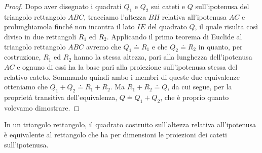 \noindent\begin{minipage}{0.55\textwidth}\parindent15pt
\begin{proof}
Dopo aver disegnato i quadrati $Q_1$ e $Q_2$ sui cateti e $Q$ 
sull'ipotenusa del triangolo rettangolo $ABC$, tracciamo l'altezza 
$BH$ relativa all'ipotenusa $AC$ e prolunghiamola finché non incontra 
il lato $IE$ del quadrato $Q$, il quale risulta così diviso in due 
rettangoli $R_1$ ed $R_2$.
Applicando il primo teorema di Euclide al triangolo rettangolo $ABC$ 
avremo che $Q_1\doteq R_1$ e che $Q_2\doteq R_2$ in quanto, per 
costruzione, $R_1$ ed $R_2$ hanno la stessa altezza, pari alla 
lunghezza dell'ipotenusa $AC$ e ognuno di essi ha la base pari alla 
proiezione sull'ipotenusa stessa del relativo cateto. Sommando quindi 
ambo i membri di queste due equivalenze otteniamo che $Q_1+Q_2\doteq 
R_1+R_2$. Ma $R_1+R_2\doteq Q$, da cui segue, per la proprietà 
transitiva dell'equivalenza, $Q\doteq Q_1+Q_2$, che è proprio quanto 
volevamo dimostrare.
\end{proof}
\end{minipage}\hfil
\begin{minipage}{0.45\textwidth}
	\centering
\end{minipage}\vspace{8pt}


\begin{teorema}
In un triangolo rettangolo, il quadrato costruito sull'altezza 
relativa all'ipotenusa è equivalente al rettangolo che ha per 
dimensioni le proiezioni dei cateti sull'ipotenusa.
\end{teorema}

